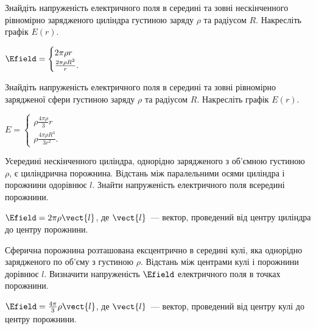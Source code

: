 \begin{problem}
    Знайдіть напруженість електричного поля в середині та зовні нескінченного рівномірно зарядженого циліндра густиною заряду $\rho$ та радіусом $R$. Накресліть графік $E(r)$.
\begin{solution}
	$\Efield =
		\begin{cases}
			2\pi\rho r\\
			\frac{2\pi\rho R^2}{r}.
		\end{cases}
	$
\end{solution}
\end{problem}

\begin{problem}
    Знайдіть напруженість електричного поля в середині та зовні рівномірно зарядженої сфери густиною заряду $\rho$ та радіусом $R$. Накресліть графік $E(r)$.
\begin{solution}
	$E =
		\begin{cases}
			\rho\frac{4\pi\rho}{3}r\\
			\rho\frac{4\pi\rho R^3}{3 r^2}.
		\end{cases}
	$
\end{solution}
\end{problem}

\begin{problem}
    Усередині нескінченного циліндра, однорідно зарядженого з об'ємною густиною $\rho$, є циліндрична порожнина. Відстань між паралельними осями циліндра і порожнини одорівнює $l$. Знайти напруженість електричного поля всередині порожнини.
\begin{solution}
	$\Efield = 2\pi\rho \vect{l}$, де $\vect{l}$~--- вектор, проведений від центру циліндра до центру порожнини.
\end{solution}
\end{problem}


\begin{problem}
Сферична порожнина розташована ексцентрично в середині кулі, яка однорідно зарядженого по об'єму з густиною
$\rho$. Відстань між центрами кулі і порожнини дорівнює $l$. Визначити напруженість $\Efield$ електричного поля в точках порожнини.
\begin{solution}
	$\Efield = \frac{4\pi}{3}\rho \vect{l}$, де $\vect{l}$~--- вектор, проведений від центру кулі до центру порожнини.
\end{solution}
\end{problem}

